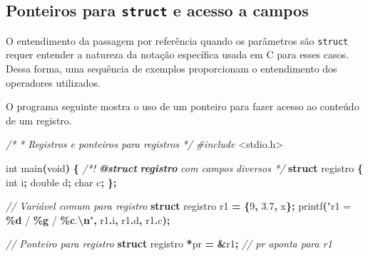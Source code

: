 \documentclass[
  11pt,
  a4paper,
]{scrbook}
\newenvironment{Shaded}{\begin{snugshade}}{\end{snugshade}}
\newcommand{\AnnotationTok}[1]{\textcolor[rgb]{0.56,0.35,0.01}{\textbf{\textit{#1}}}}
\newcommand{\CharTok}[1]{\textcolor[rgb]{0.31,0.60,0.02}{#1}}
\newcommand{\CommentTok}[1]{\textcolor[rgb]{0.56,0.35,0.01}{\textit{#1}}}
\newcommand{\CommentVarTok}[1]{\textcolor[rgb]{0.56,0.35,0.01}{\textbf{\textit{#1}}}}
\newcommand{\DataTypeTok}[1]{\textcolor[rgb]{0.13,0.29,0.53}{#1}}
\newcommand{\DecValTok}[1]{\textcolor[rgb]{0.00,0.00,0.81}{#1}}
\newcommand{\FloatTok}[1]{\textcolor[rgb]{0.00,0.00,0.81}{#1}}
\newcommand{\ImportTok}[1]{#1}
\newcommand{\KeywordTok}[1]{\textcolor[rgb]{0.13,0.29,0.53}{\textbf{#1}}}
\newcommand{\NormalTok}[1]{#1}
\newcommand{\OperatorTok}[1]{\textcolor[rgb]{0.81,0.36,0.00}{\textbf{#1}}}
\newcommand{\PreprocessorTok}[1]{\textcolor[rgb]{0.56,0.35,0.01}{\textit{#1}}}
\newcommand{\SpecialCharTok}[1]{\textcolor[rgb]{0.81,0.36,0.00}{\textbf{#1}}}
\newcommand{\StringTok}[1]{\textcolor[rgb]{0.31,0.60,0.02}{#1}}
\begin{document}
\subsection{\texorpdfstring{Ponteiros para \texttt{struct} e acesso a
campos}{Ponteiros para struct e acesso a campos}}\label{ponteiros-para-struct-e-acesso-a-campos}

O entendimento da passagem por referência quando os parâmetros são
\texttt{struct} requer entender a natureza da notação específica usada
em C para esses casos. Dessa forma, uma sequência de exemplos
proporcionam o entendimento dos operadores utilizados.

O programa seguinte mostra o uso de um ponteiro para fazer acesso ao
conteúdo de um registro.

\begin{Shaded}
\begin{Highlighting}[]
\CommentTok{/*}
\CommentTok{ * Registros e ponteiros para registros}
\CommentTok{ */}
\PreprocessorTok{\#include }\ImportTok{\textless{}stdio.h\textgreater{}}

\DataTypeTok{int}\NormalTok{ main}\OperatorTok{(}\DataTypeTok{void}\OperatorTok{)} \OperatorTok{\{}
    \CommentTok{/*! }\AnnotationTok{@struct}\CommentTok{ }\CommentVarTok{registro}\CommentTok{ com campos diversos */}
    \KeywordTok{struct}\NormalTok{ registro }\OperatorTok{\{}
        \DataTypeTok{int}\NormalTok{ i}\OperatorTok{;}
        \DataTypeTok{double}\NormalTok{ d}\OperatorTok{;}
        \DataTypeTok{char}\NormalTok{ c}\OperatorTok{;}
    \OperatorTok{\};}

    \CommentTok{// Variável comum para registro}
    \KeywordTok{struct}\NormalTok{ registro r1 }\OperatorTok{=} \OperatorTok{\{}\DecValTok{9}\OperatorTok{,} \FloatTok{3.7}\OperatorTok{,} \CharTok{\textquotesingle{}x\textquotesingle{}}\OperatorTok{\};}
\NormalTok{    printf}\OperatorTok{(}\StringTok{"r1 = }\SpecialCharTok{\%d}\StringTok{ / }\SpecialCharTok{\%g}\StringTok{ / \textquotesingle{}}\SpecialCharTok{\%c}\StringTok{\textquotesingle{}.}\SpecialCharTok{\textbackslash{}n}\StringTok{"}\OperatorTok{,}\NormalTok{ r1}\OperatorTok{.}\NormalTok{i}\OperatorTok{,}\NormalTok{ r1}\OperatorTok{.}\NormalTok{d}\OperatorTok{,}\NormalTok{ r1}\OperatorTok{.}\NormalTok{c}\OperatorTok{);}

    \CommentTok{// Ponteiro para registro}
    \KeywordTok{struct}\NormalTok{ registro }\OperatorTok{*}\NormalTok{pr }\OperatorTok{=} \OperatorTok{\&}\NormalTok{r1}\OperatorTok{;}  \CommentTok{// pr aponta para r1}


\end{Highlighting}
\end{Shaded}
\end{document}
